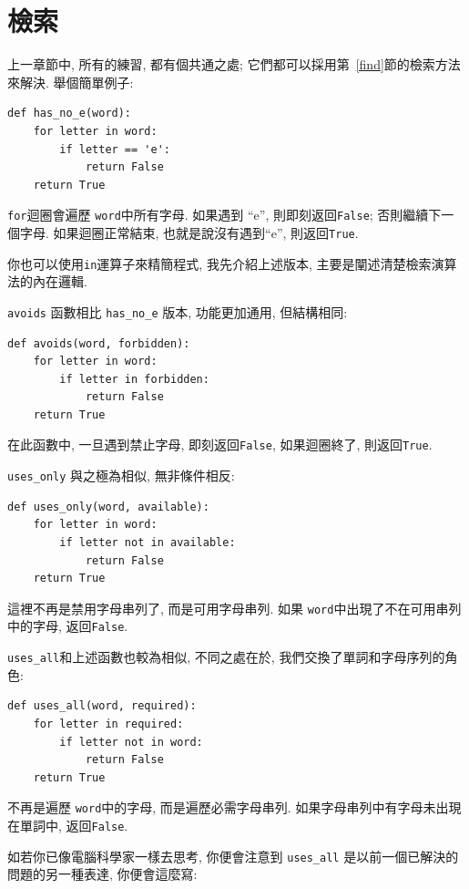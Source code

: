 \documentclass[10pt]{book}
\begin{document}
\section{檢索}
\label{search}

上一章節中, 所有的練習, 都有個共通之處;
它們都可以採用第~\ref{find}節的檢索方法來解決. 
舉個簡單例子:

\begin{verbatim}
def has_no_e(word):
    for letter in word:
        if letter == 'e':
            return False
    return True
\end{verbatim}
%
{\tt for}迴圈會遍歷 {\tt word}中所有字母. 
如果遇到 ``e'', 則即刻返回{\tt False};
否則繼續下一個字母. 
如果迴圈正常結束, 也就是說沒有遇到``e'',  則返回{\tt True}.

你也可以使用{\tt in}運算子來精簡程式, 
我先介紹上述版本, 主要是闡述清楚檢索演算法的內在邏輯. 

{\tt avoids} 函數相比 \verb"has_no_e" 版本, 功能更加通用, 
但結構相同:

\begin{verbatim}
def avoids(word, forbidden):
    for letter in word:
        if letter in forbidden:
            return False
    return True
\end{verbatim}
%
在此函數中, 一旦遇到禁止字母, 即刻返回{\tt False}, 
如果迴圈終了, 則返回{\tt True}. 

\verb"uses_only" 與之極為相似, 無非條件相反:

\begin{verbatim}
def uses_only(word, available):
    for letter in word: 
        if letter not in available:
            return False
    return True
\end{verbatim}
%
這裡不再是禁用字母串列了, 而是可用字母串列. 
如果 {\tt word}中出現了不在可用串列中的字母, 返回{\tt False}.

\verb"uses_all"和上述函數也較為相似, 不同之處在於, 
我們交換了單詞和字母序列的角色:

\begin{verbatim}
def uses_all(word, required):
    for letter in required: 
        if letter not in word:
            return False
    return True
\end{verbatim}
%
不再是遍歷 {\tt word}中的字母, 
而是遍歷必需字母串列. 
如果字母串列中有字母未出現在單詞中, 返回{\tt False}.

如若你已像電腦科學家一樣去思考, 你便會注意到 \verb"uses_all" 
是以前一個已解決的問題的另一種表達, 你便會這麼寫:
\end{document}
